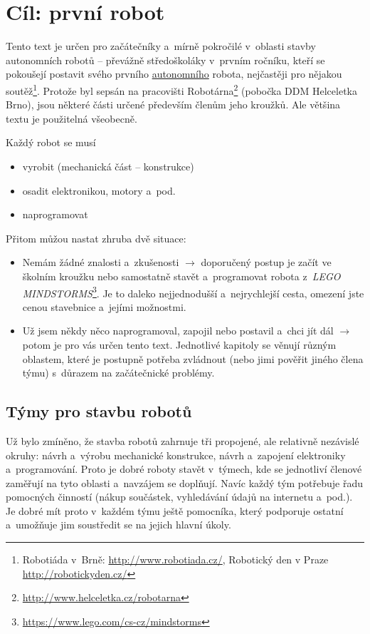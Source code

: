 \section{Cíl: první robot}


Tento text je určen pro začátečníky a~mírně pokročilé v~oblasti stavby autonomních robotů -- převážně středoškoláky v~prvním ročníku, kteří se pokoušejí postavit svého prvního \hyperlink{autonomni}{autonomního}
robota, nejčastěji pro nějakou soutěž\footnote{Robotiáda v~Brně: 
\url{http://www.robotiada.cz/}, Robotický den v Praze \url{http://robotickyden.cz/} }. 
Protože byl sepsán na pracovišti Robotárna\footnote{\url{http://www.helceletka.cz/robotarna}} (pobočka DDM Helceletka Brno), jsou některé části určené především členům jeho kroužků. Ale většina textu je použitelná všeobecně.

Každý robot se musí 
\begin{itemize} 	%
\item vyrobit (mechanická část -- konstrukce)
\item osadit elektronikou, motory a~pod.
\item naprogramovat 
\end{itemize}

Přitom můžou nastat zhruba dvě situace:

\begin{itemize} %
\item  Nemám žádné znalosti a~zkušenosti $\rightarrow$ doporučený 
postup je začít ve školním kroužku nebo samostatně stavět a~programovat 
robota z~{\it LEGO MINDSTORMS}\footnote{\url{https://www.lego.com/cs-cz/mindstorms}}.
Je to daleko nejjednodušší a~nejrychlejší cesta, omezení jste cenou stavebnice a~jejími možnostmi.
\item  Už jsem někdy něco naprogramoval, zapojil nebo postavil a~chci jít dál $\rightarrow$ potom je pro vás určen tento text.
Jednotlivé kapitoly se věnují různým oblastem, které je postupně potřeba zvládnout (nebo jimi pověřit jiného člena týmu) s~důrazem na začátečnické problémy.
\end{itemize}

\subsection{Týmy pro stavbu robotů}

Už bylo zmíněno, že stavba robotů zahrnuje tři propojené, 
ale relativně nezávislé okruhy: návrh a~výrobu mechanické konstrukce, 
návrh a~zapojení elektroniky a~programování.
Proto je dobré roboty stavět v~týmech, kde se jednotliví členové zaměřují na tyto oblasti a~navzájem se doplňují.
Navíc každý tým potřebuje řadu pomocných činností (nákup součástek, vyhledávání údajů na internetu a~pod.).
Je dobré mít proto v~každém týmu ještě pomocníka, který podporuje ostatní a~umožňuje jim soustředit se na jejich hlavní úkoly.

